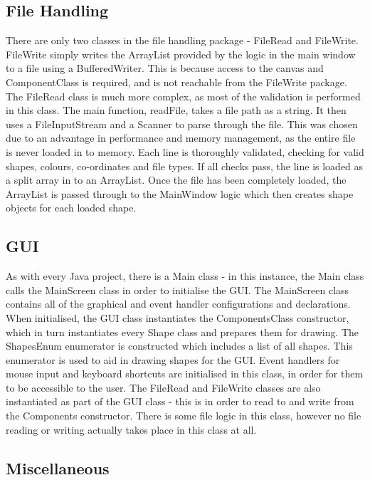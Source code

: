 \documentclass[12pt]{article} %
\begin{document}
\subsection{File Handling}
There are only two classes in the file handling package - FileRead and FileWrite. FileWrite simply writes the ArrayList provided by the logic in the main window to a file using a BufferedWriter. This is because access to the canvas and ComponentClass is required, and is not reachable from the FileWrite package. The FileRead class is much more complex, as most of the validation is performed in this class. The main function, readFile, takes a file path as a string. It then uses a FileInputStream and a Scanner to parse through the file. This was chosen due to an advantage in performance and memory management, as the entire file is never loaded in to memory. Each line is thoroughly validated, checking for valid shapes, colours, co-ordinates and file types. If all checks pass, the line is loaded as a split array in to an ArrayList. Once the file has been completely loaded, the ArrayList is passed through to the MainWindow logic which then creates shape objects for each loaded shape. 

\subsection{GUI}
As with every Java project, there is a Main class - in this instance, the Main class calls the MainScreen class in order to initialise the GUI. The MainScreen class contains all of the graphical and event handler configurations and declarations. When initialised, the GUI class instantiates the ComponentsClass constructor, which in turn instantiates every Shape class and prepares them for drawing. The ShapesEnum enumerator is constructed which includes a list of all shapes. This enumerator is used to aid in drawing shapes for the GUI. Event handlers for mouse input and keyboard shortcuts are initialised in this class, in order for them to be accessible to the user. The FileRead and FileWrite classes are also instantiated as part of the GUI class - this is in order to read to and write from the Components constructor. There is some file logic in this class, however no file reading or writing actually takes place in this class at all.

\subsection{Miscellaneous}
\end{document}

